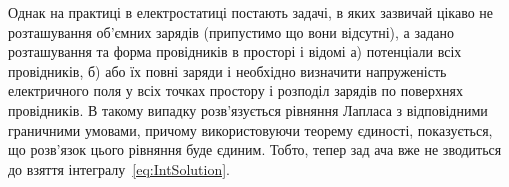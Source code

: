 \documentclass[]{ProblemBook}
\begin{document}

Однак на практиці в електростатиці постають задачі, в яких зазвичай цікаво не розташування об'ємних зарядів (припустимо що вони відсутні), а задано розташування та форма провідників в просторі і відомі а) потенціали всіх провідників, б) або їх повні заряди і  необхідно визначити напруженість електричного поля у всіх точках простору і розподіл зарядів по поверхнях провідників. В такому випадку розв'язується рівняння Лапласа з відповідними граничними умовами, причому використовуючи теорему єдиності, показується, що розв'язок цього рівняння буде єдиним. Тобто, тепер зад ача вже не зводиться до взяття інтегралу~\eqref{eq:IntSolution}. 
\end{document}
